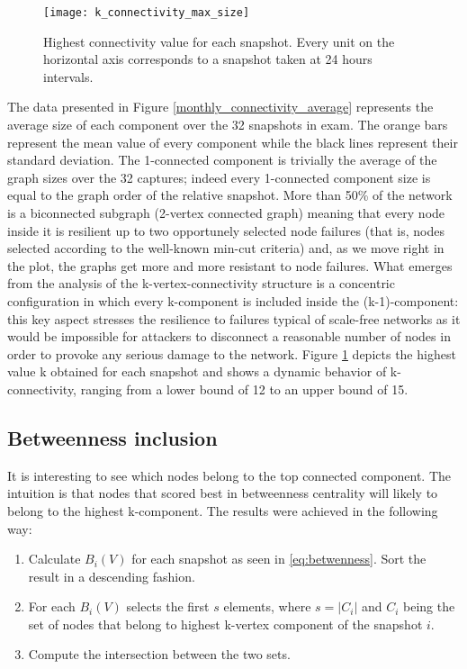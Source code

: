 	\begin{figure}
		\texttt{[image: k\_connectivity\_max\_size]}
		\caption{Highest connectivity value for each snapshot. Every unit on the horizontal axis corresponds to a snapshot taken at 24 hours intervals.}
		\label{monthly_connectivity_max_size}
	\end{figure}
	
	The data presented in Figure \ref{monthly_connectivity_average} represents the average size of each component over the 32 snapshots in exam. The orange bars represent the mean value of every component while the black lines represent their standard deviation.	The 1-connected component is trivially the average of the graph sizes over the 32 captures; indeed every 1-connected component size is equal to the graph order of the relative snapshot. More than 50\% of the network is a biconnected subgraph (2-vertex connected graph) meaning that every node inside it is resilient up to two opportunely selected node failures (that is, nodes selected according to the well-known min-cut criteria) and, as we move right in the plot, the graphs get more and more resistant to node failures. What emerges from the analysis of the k-vertex-connectivity structure is a concentric configuration in which every k-component is included inside the (k-1)-component: this key aspect stresses the resilience to failures typical of scale-free networks as it would be impossible for attackers to disconnect a reasonable number of nodes in order to provoke any serious damage to the network. Figure \ref{monthly_connectivity_max_size} depicts the highest value k obtained for each snapshot and shows a dynamic behavior of k-connectivity, ranging from a lower bound of 12 to an upper bound of 15.
	
	\subsection{Betweenness inclusion}
	
	It is interesting to see which nodes belong to the top connected component. The intuition is that nodes that scored best in betweenness centrality will likely to belong to the highest k-component. The results were achieved in the following way:
	\begin{enumerate}
		\item Calculate $B_i(V)$ for each snapshot as seen in \ref{eq:betwenness}. Sort the result in a descending fashion. 
		\item For each $B_i(V)$ selects the first $s$ elements, where $s = |C_i|$ and $C_i$ being the set of nodes that belong to highest k-vertex component of the snapshot $i$.
		\item Compute the intersection between the two sets.
	\end{enumerate}
	
